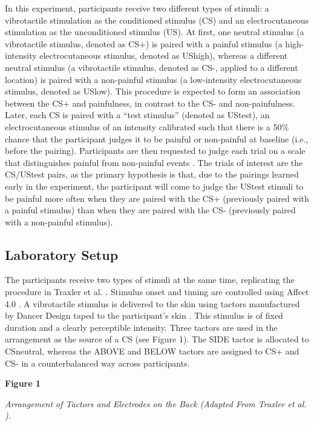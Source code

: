 \documentclass{article}
\begin{document}
In this experiment, participants receive two different types of stimuli: a vibrotactile stimulation as the conditioned stimulus (CS) and an electrocutaneous stimulation as the unconditioned stimulus (US). At first, one neutral stimulus (a vibrotactile stimulus, denoted as CS+) is paired with a painful stimulus (a high-intensity electrocutaneous stimulus, denoted as UShigh), whereas a different neutral stimulus (a vibrotactile stimulus, denoted as CS-, applied to a different location) is paired with a non-painful stimulus (a low-intensity electrocutaneous stimulus, denoted as USlow). This procedure is expected to form an association between the CS+ and painfulness, in contrast to the CS- and non-painfulness. Later, each CS is paired with a “test stimulus” (denoted as UStest), an electrocutaneous stimulus of an intensity calibrated such that there is a 50\% chance that the participant judges it to be painful or non-painful at baseline (i.e., before the pairing). Participants are then requested to judge each trial on a scale that distinguishes painful from non-painful events \autocite{Madden2019}. The trials of interest are the CS/UStest pairs, as the primary hypothesis is that, due to the pairings learned early in the experiment, the participant will come to judge the UStest stimuli to be painful more often when they are paired with the CS+ (previously paired with a painful stimulus) than when they are paired with the CS- (previously paired with a non-painful stimulus).

\subsection{Laboratory Setup}

The participants receive two types of stimuli at the same time, replicating the procedure in Traxler et al. \autocite{Traxler2019}. Stimulus onset and timing are controlled using Affect 4.0 \autocite{Spruyt2009}. A vibrotactile stimulus is delivered to the skin using tactors manufactured by Dancer Design taped to the participant's skin \autocite{Dancer Design0}. This stimulus is of fixed duration and a clearly perceptible intensity. Three tactors are used in the arrangement as the source of a CS (see Figure 1). The SIDE tactor is allocated to CSneutral, whereas the ABOVE and BELOW tactors are assigned to CS+ and CS- in a counterbalanced way across participants.

\textbf{Figure 1}

\emph{Arrangement of Tactors and Electrodes on the Back}\emph{ }\emph{(Adapted From Traxler et al. }\autocite{Traxler2019}\emph{)}\emph{.}
\end{document}
